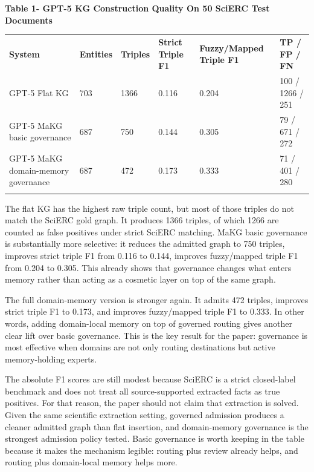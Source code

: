 \textbf{Table 1- GPT-5 KG Construction Quality On 50 SciERC Test
Documents}

{\def\LTcaptype{none} %
\begin{longtable}[]{@{}llllll@{}}
\toprule\noalign{}
\textbf{System} & \textbf{Entities} & \textbf{Triples} & \textbf{Strict
Triple F1} & \textbf{Fuzzy/Mapped Triple F1} & \textbf{TP / FP / FN} \\
GPT-5 Flat KG & 703 & 1366 & 0.116 & 0.204 & 100 / 1266 / 251 \\
GPT-5 MaKG basic governance & 687 & 750 & 0.144 & 0.305 & 79 / 671 /
272 \\
GPT-5 MaKG domain-memory governance & 687 & 472 & 0.173 & 0.333 & 71 /
401 / 280 \\
\midrule\noalign{}
\endhead
\bottomrule\noalign{}
\endlastfoot
\end{longtable}
}

The flat KG has the highest raw triple count, but most of those triples
do not match the SciERC gold graph. It produces 1366 triples, of which
1266 are counted as false positives under strict SciERC matching. MaKG
basic governance is substantially more selective: it reduces the
admitted graph to 750 triples, improves strict triple F1 from 0.116 to
0.144, improves fuzzy/mapped triple F1 from 0.204 to 0.305. This already
shows that governance changes what enters memory rather than acting as a
cosmetic layer on top of the same graph.

The full domain-memory version is stronger again. It admits 472 triples,
improves strict triple F1 to 0.173, and improves fuzzy/mapped triple F1
to 0.333. In other words, adding domain-local memory on top of governed
routing gives another clear lift over basic governance. This is the key
result for the paper: governance is most effective when domains are not
only routing destinations but active memory-holding experts.

The absolute F1 scores are still modest because SciERC is a strict
closed-label benchmark and does not treat all source-supported extracted
facts as true positives. For that reason, the paper should not claim
that extraction is solved. Given the same scientific extraction setting,
governed admission produces a cleaner admitted graph than flat
insertion, and domain-memory governance is the strongest admission
policy tested. Basic governance is worth keeping in the table because it
makes the mechanism legible: routing plus review already helps, and
routing plus domain-local memory helps more.

